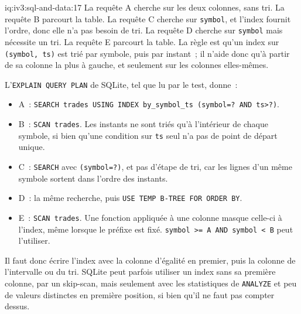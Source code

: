\begin{solution}{iq:iv3:sql-and-data:17}
La requête A cherche sur les deux colonnes, sans tri. La requête B parcourt la table. La requête C cherche sur \texttt{symbol}, et l'index fournit l'ordre, donc elle n'a pas besoin de tri. La requête D cherche sur \texttt{symbol} mais nécessite un tri. La requête E parcourt la table. La règle est qu'un index sur \texttt{(symbol, ts)} est trié par symbole, puis par instant~; il n'aide donc qu'à partir de sa colonne la plus à gauche, et seulement sur les colonnes elles-mêmes.

L'\texttt{EXPLAIN QUERY PLAN} de SQLite, tel que lu par le test, donne~:
\begin{itemize}
\item A~: \texttt{SEARCH trades USING INDEX by\_symbol\_ts (symbol=? AND ts>?)}.
\item B~: \texttt{SCAN trades}. Les instants ne sont triés qu'à l'intérieur de chaque symbole, si bien qu'une condition sur \texttt{ts} seul n'a pas de point de départ unique.
\item C~: \texttt{SEARCH} avec \texttt{(symbol=?)}, et pas d'étape de tri, car les lignes d'un même symbole sortent dans l'ordre des instants.
\item D~: la même recherche, puis \texttt{USE TEMP B-TREE FOR ORDER BY}.
\item E~: \texttt{SCAN trades}. Une fonction appliquée à une colonne masque celle-ci à l'index, même lorsque le préfixe est fixé. \texttt{symbol >= \textquotesingle{}A\textquotesingle{} AND symbol < \textquotesingle{}B\textquotesingle{}} peut l'utiliser.
\end{itemize}

Il faut donc écrire l'index avec la colonne d'égalité en premier, puis la colonne de l'intervalle ou du tri. SQLite peut parfois utiliser un index sans sa première colonne, par un skip-scan, mais seulement avec les statistiques de \texttt{ANALYZE} et peu de valeurs distinctes en première position, si bien qu'il ne faut pas compter dessus.

\end{solution}

